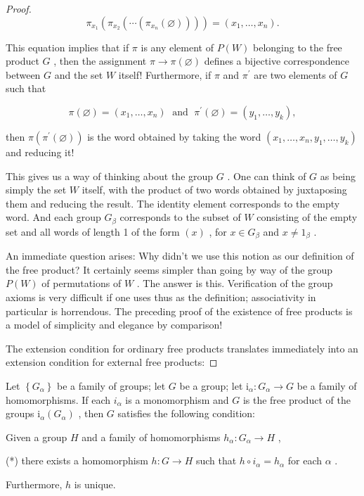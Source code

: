 \begin{proof}
\[
{\pi }_{{x}_{1}}\left( {{\pi }_{{x}_{2}}\left( {\cdots \left( {{\pi }_{{x}_{n}}\left( \varnothing \right) }\right) }\right) }\right)  = \left( {{x}_{1},\ldots ,{x}_{n}}\right) .
\]

This equation implies that if \(\pi\) is any element of \(P\left( W\right)\) belonging to the free product \(G\) , then the assignment \(\pi  \rightarrow  \pi \left( \varnothing \right)\) defines a bijective correspondence between \(G\) and the set \(W\) itself! Furthermore, if \(\pi\) and \({\pi }^{\prime }\) are two elements of \(G\) such that

\[
\pi \left( \varnothing \right)  = \left( {{x}_{1},\ldots ,{x}_{n}}\right) \;\text{ and }\;{\pi }^{\prime }\left( \varnothing \right)  = \left( {{y}_{1},\ldots ,{y}_{k}}\right) ,
\]

then \(\pi \left( {{\pi }^{\prime }\left( \varnothing \right) }\right)\) is the word obtained by taking the word \(\left( {{x}_{1},\ldots ,{x}_{n},{y}_{1},\ldots ,{y}_{k}}\right)\) and reducing it!

This gives us a way of thinking about the group \(G\) . One can think of \(G\) as being simply the set \(W\) itself, with the product of two words obtained by juxtaposing them and reducing the result. The identity element corresponds to the empty word. And each group \({G}_{\beta }\) corresponds to the subset of \(W\) consisting of the empty set and all words of length 1 of the form \(\left( x\right)\) , for \(x \in  {G}_{\beta }\) and \(x \neq  {1}_{\beta }\) .

An immediate question arises: Why didn't we use this notion as our definition of the free product? It certainly seems simpler than going by way of the group \(P\left( W\right)\) of permutations of \(W\) . The answer is this. Verification of the group axioms is very difficult if one uses thus as the definition; associativity in particular is horrendous. The preceding proof of the existence of free products is a model of simplicity and elegance by comparison!

The extension condition for ordinary free products translates immediately into an extension condition for external free products:
\end{proof}
\begin{lemma} Let \(\left\{  {G}_{\alpha }\right\}\) be a family of groups; let \(G\) be a group; let \({\mathrm{i}}_{\alpha } : {G}_{\alpha } \rightarrow  G\) be a family of homomorphisms. If each \({i}_{\alpha }\) is a monomorphism and \(G\) is the free product of the groups \({\mathrm{i}}_{\alpha }\left( {G}_{\alpha }\right)\) , then \(G\) satisfies the following condition:

Given a group \(H\) and a family of homomorphisms \({h}_{\alpha } : {G}_{\alpha } \rightarrow  H\) ,

(*) there exists a homomorphism \(h : G \rightarrow  H\) such that \(h \circ  {i}_{\alpha } = {h}_{\alpha }\) for each \(\alpha\) .

Furthermore, \(h\) is unique.
\end{lemma}

